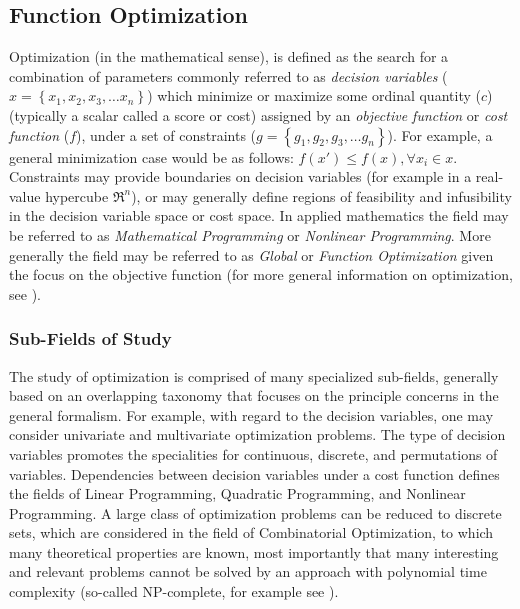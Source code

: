 \documentclass[a4paper, 11pt]{article}
\begin{document}
\subsection{Function Optimization}
Optimization (in the mathematical sense), is defined as the search for a combination of parameters commonly referred to as \emph{decision variables} ($x = \left\{x_1, x_2, x_3, \ldots x_n\right\}$) which minimize or maximize some ordinal quantity ($c$) (typically a scalar  called a score or cost) assigned by an \emph{objective function} or \emph{cost function} ($f$), under a set of constraints ($g = \left\{g_1, g_2, g_3, \ldots g_n\right\}$). For example, a general minimization case would be as follows: $f(x\prime) \leq f(x), \forall x_i \in x$. Constraints may provide boundaries on decision variables (for example in a real-value hypercube $\Re^n$), or may generally define regions of feasibility and infusibility in the decision variable space or cost space. In applied mathematics the field may be referred to as \emph{Mathematical Programming} or \emph{Nonlinear Programming}. More generally the field may be referred to as \emph{Global} or \emph{Function Optimization} given the focus on the objective function (for more general information on optimization, see \cite{Horst2000, Boyd2004}). 

%
%
\subsubsection{Sub-Fields of Study}
The study of optimization is comprised of many specialized sub-fields, generally based on an overlapping taxonomy that focuses on the principle concerns in the general formalism. 
For example, with regard to the decision variables, one may consider univariate and multivariate optimization problems. The type of decision variables promotes the specialities for continuous, discrete, and permutations of variables. Dependencies between decision variables under a cost function defines the fields of Linear Programming, Quadratic Programming, and Nonlinear Programming. A large class of optimization problems can be reduced to discrete sets, which are considered in the field of Combinatorial Optimization, to which many theoretical properties are known, most importantly that many interesting and relevant problems cannot be solved by an approach with polynomial time complexity (so-called NP-complete, for example see \cite{Papadimitriou1998}).
\end{document}

